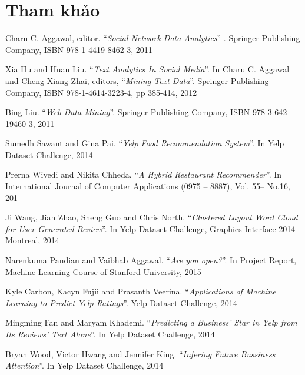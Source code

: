 \documentclass[12pt]{extarticle}
\begin{document}
	\section {Tham khảo}
\par [1]\hspace{15pt}Charu C. Aggawal, editor. “\textit{Social Network Data Analytics}” . Springer Publishing Company, ISBN 978-1-4419-8462-3, 2011
\par [2]\hspace{15pt}Xia Hu and Huan Liu. “\textit{Text Analytics In Social Media}”. In Charu C. Aggawal and Cheng Xiang Zhai, editors, “\textit{Mining Text Data}”. Springer Publishing Company, ISBN 978-1-4614-3223-4, pp 385-414, 2012
\par [3]\hspace{15pt}Bing Liu. “\textit{Web Data Mining}”. Springer Publishing Company, ISBN 978-3-642-19460-3, 2011
\par [4]\hspace{15pt}Sumedh Sawant and Gina Pai. “\textit{Yelp Food Recommendation System}”. In Yelp Dataset Challenge, 2014
\par [5]\hspace{15pt}Prerna Wivedi and Nikita Chheda. “\textit{A Hybrid Restaurant Recommender}”. In International Journal of Computer Applications (0975 – 8887), Vol. 55– No.16, 201
\par [6]\hspace{15pt}Ji Wang, Jian Zhao, Sheng Guo and Chris North. “\textit{Clustered Layout Word Cloud for User Generated Review}”. In Yelp Dataset Challenge, Graphics Interface 2014 Montreal, 2014
\par [7]\hspace{15pt}Narenkuma Pandian and Vaibhab Aggawal. “\textit{Are you open?}”. In Project Report, Machine Learning Course of Stanford University, 2015
\par [8]\hspace{15pt}Kyle Carbon, Kacyn Fujii and Prasanth Veerina. “\textit{Applications of Machine Learning to Predict Yelp Ratings}”. Yelp Dataset Challenge, 2014
\par [9]\hspace{15pt}Mingming Fan and Maryam Khademi. “\textit{Predicting a Business’ Star in Yelp from Its Reviews’ Text Alone}”. In Yelp Dataset Challenge, 2014
\par [10]\hspace{9pt}Bryan Wood, Victor Hwang and Jennifer King. “\textit{Infering Future Bussiness Attention}”. In Yelp Dataset Challenge, 2014
\end{document}
